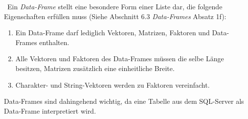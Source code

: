 ~\newline Ein \textit{Data-Frame} stellt eine besondere Form einer Liste dar, die folgende Eigenschaften erfüllen muss (Siehe \cite{RIntro} Abschnitt 6.3 \textit{Data-Frames} Absatz 1f): 
\begin{enumerate}
	\item Ein Data-Frame darf lediglich Vektoren, Matrizen, Faktoren und Data-Frames enthalten.
	\item Alle Vektoren und Faktoren des Data-Frames müssen die selbe Länge besitzen, Matrizen zusätzlich eine einheitliche Breite.
	\item Charakter- und String-Vektoren werden zu Faktoren vereinfacht.
\end{enumerate} 
Data-Frames sind dahingehend wichtig, da eine Tabelle aus dem SQL-Server als Data-Frame interpretiert wird. 

